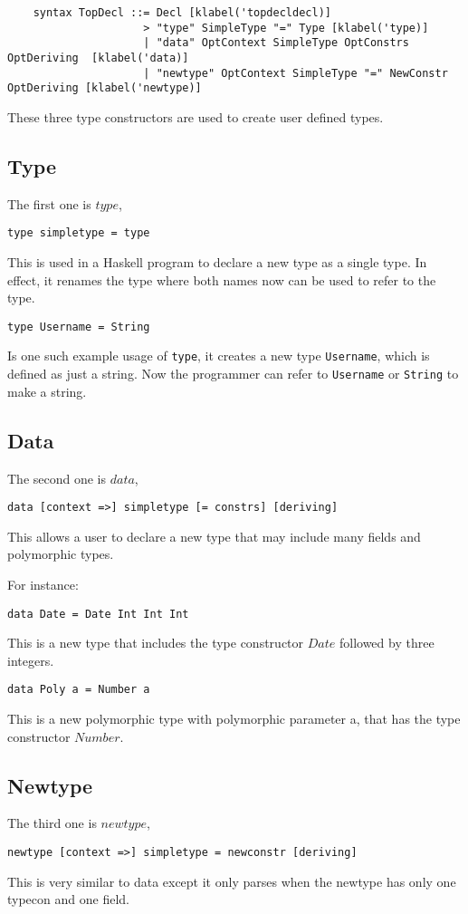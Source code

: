 \begin{lstlisting}
    syntax TopDecl ::= Decl [klabel('topdecldecl)]
                     > "type" SimpleType "=" Type [klabel('type)]
                     | "data" OptContext SimpleType OptConstrs OptDeriving  [klabel('data)]
                     | "newtype" OptContext SimpleType "=" NewConstr OptDeriving [klabel('newtype)]
\end{lstlisting}

These three type constructors are used to create user defined types.

\subsection{Type}
The first one is $type$,
	\begin{lstlisting}
type simpletype = type 
	\end{lstlisting}
This is used in a Haskell program to declare a new type as a single type. In effect, it renames the type where both names now can be used to refer to the type.
	\begin{lstlisting}
type Username = String
	\end{lstlisting}
Is one such example usage of \texttt{type}, it creates a new type \texttt{Username}, which is defined as just a string. Now the programmer can refer to \texttt{Username} or \texttt{String} to make a string.

\subsection{Data}
The second one is $data$,
\begin{lstlisting}
data [context =>] simpletype [= constrs] [deriving]
\end{lstlisting}
This allows a user to declare a new type that may include many fields and polymorphic types.

For instance:
\begin{lstlisting}
data Date = Date Int Int Int
\end{lstlisting}
This is a new type that includes the type constructor $Date$ followed by three integers.
\begin{lstlisting}
data Poly a = Number a
\end{lstlisting}
This is a new polymorphic type with polymorphic parameter a, that has the type constructor $Number$.

\subsection{Newtype}
The third one is $newtype$,
\begin{lstlisting}
newtype [context =>] simpletype = newconstr [deriving]
\end{lstlisting}
This is very similar to data except it only parses when the newtype has only one typecon and one field.


